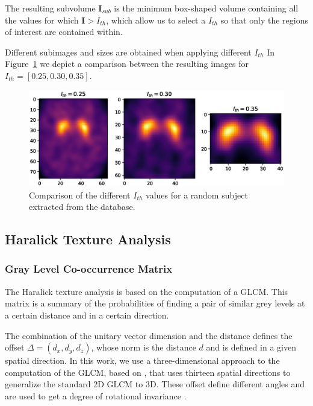 The resulting subvolume $\mathbf{I}_{sub}$ is the minimum box-shaped volume containing all the values for which $\mathbf{I}>I_{th}$, which allow us to select a $I_{th}$ so that only the regions of interest are contained within. 

Different subimages and sizes are obtained when applying different $I_{th}$ In Figure~\ref{fig:comparisonIth} we depict a comparison between the resulting images for $I_{th} = [0.25, 0.30, 0.35]$. 

\begin{figure}
	\centering
	\includegraphics[width=0.90\columnwidth]{Graphics/ch5/comparisonIth.eps}
	\caption[Comparison of the different $I_{th}$ values.]{Comparison of the different $I_{th}$ values for a random subject extracted from the \ppmidat{} database.}
	\label{fig:comparisonIth}
\end{figure}

\subsection{Haralick Texture Analysis}\label{sec:haralick}
\subsubsection{Gray Level Co-occurrence Matrix}
The Haralick texture analysis is based on the computation of a \acf{GLCM}. This matrix is a summary of the probabilities of finding a pair of similar grey levels at a certain distance and in a certain direction. 

The combination of the unitary vector dimension and the distance defines the offset $\Delta=(d_x,d_y,d_z)$, whose norm is the distance $d$ and is defined in a given spatial direction. In this work, we use a three-dimensional approach to the computation of the \ac{GLCM}, based on \cite{Philips2008}, that uses thirteen spatial directions to generalize the standard 2D \ac{GLCM} to 3D. These offset define different angles and are used to get a degree of rotational invariance \cite{Philips2008}. 

